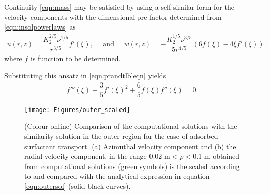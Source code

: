 \documentclass[]{jfm}
\begin{document}
Continuity \eqref{eqn:mass} may be satisfied by using a self similar form for the velocity components with the dimensional pre-factor determined from \eqref{eqn:insolpowerlaws} as 
\begin{align}
 u(r,z) = \dfrac{K_2^{2/5} \nu^{1/5}}{r^{3/5}} f'(\xi), \quad \text{ and } \quad  
 w(r,z) =-\dfrac{{K_2^{1/5} \nu^{3/5}}}{5r^{4/5}}  \left( 6 f(\xi) - {4\xi} f'(\xi)\right). \label{eqn:ansatz}
\end{align}
where $f$ is function to be determined. 

Substituting this ansatz in \eqref{eqn:prandtlbleqn} yields
\begin{align}
f'''(\xi) + \dfrac{3}{5} f'(\xi)^2  + \dfrac{6}{5} f(\xi)f''(\xi) = 0. \label{eqn:selfsimilarode}
\end{align}
\begin{figure}
\centerline{\texttt{[image: Figures/outer\_scaled]}}
\caption{(Colour online) Comparison of the computational solutions with the similarity solution in the outer region for the case of adsorbed surfactant transport.
(a) Azimuthal velocity component and (b) the radial velocity component, in the range 0.02 m$<\rho<$0.1 m obtained from computational solutions (green symbols) is the scaled according to and compared with the analytical expression in equation \ref{eqn:outersol} (solid black curves).}
\label{fig:outer_scaled}
\end{figure}
\end{document}
